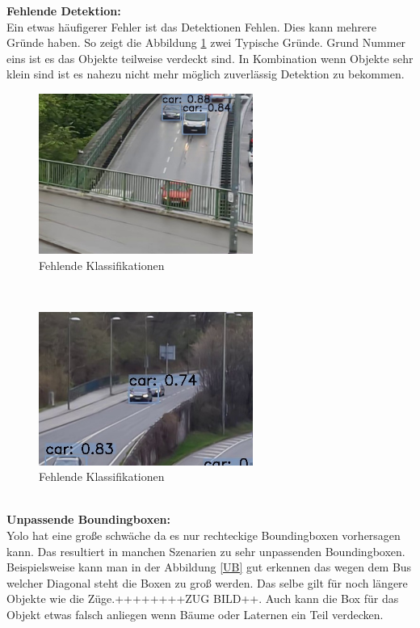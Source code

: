 \documentclass[conference]{IEEEtran}
\begin{document}
	\textbf{Fehlende Detektion:}\\
	Ein etwas häufigerer Fehler ist das Detektionen Fehlen. Dies kann mehrere Gründe haben. So zeigt die Abbildung \ref{FeK} zwei Typische Gründe. Grund Nummer eins ist es das Objekte teilweise verdeckt sind. In Kombination wenn Objekte sehr klein sind ist es nahezu nicht mehr möglich zuverlässig Detektion zu bekommen.
	\begin{figure}[!h]
		\begin{center}
			\includegraphics[width=7cm]{Media/Output_680 - Kopie.jpg}
			\caption{Fehlende Klassifikationen}
			\label{FeK}
		\end{center}
	\end{figure}\\
	\begin{figure}[!h]
		\begin{center}
			\includegraphics[width=7cm]{Media/Output_108 - Kopie.jpg}
			\caption{Fehlende Klassifikationen}
			\label{FeK2}
		\end{center}
	\end{figure}\\
	\textbf{Unpassende Boundingboxen:}\\
	Yolo hat eine große schwäche da es nur rechteckige Boundingboxen vorhersagen kann. Das resultiert in manchen Szenarien zu sehr unpassenden Boundingboxen. Beispielsweise kann man in der Abbildung \ref{UB} gut erkennen das wegen dem Bus welcher Diagonal steht die Boxen zu groß werden. Das selbe gilt für noch längere Objekte wie die Züge.++++++++ZUG BILD++. Auch kann die Box für das Objekt etwas falsch anliegen wenn Bäume oder Laternen ein Teil verdecken.
\end{document}
